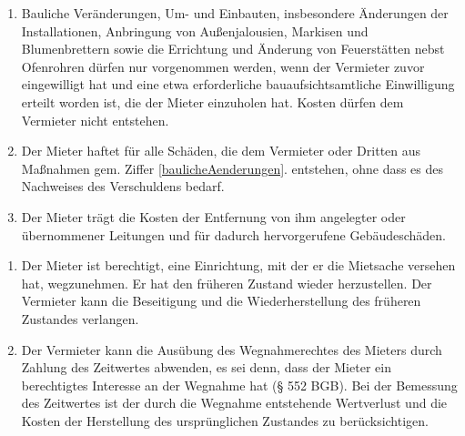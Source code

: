 \documentclass{scrreprt}[12pt,a4paper,twoside,duplex]
\begin{document}
\begin{contract}
\begin{enumerate}
  \item\label{baulicheAenderungen} Bauliche Veränderungen, Um- und Einbauten, insbesondere Änderungen der
  Installationen, Anbringung von Außenjalousien, Markisen und Blumenbrettern
  sowie die Errichtung und Änderung von Feuerstätten nebst Ofenrohren dürfen nur
  vorgenommen werden, wenn der Vermieter zuvor eingewilligt hat und eine etwa
  erforderliche bauaufsichtsamtliche Einwilligung erteilt worden ist, die der
  Mieter einzuholen hat. Kosten dürfen dem Vermieter nicht entstehen.
  \item Der Mieter haftet für alle Schäden, die dem Vermieter oder Dritten aus
  Maßnahmen gem. Ziffer \ref{baulicheAenderungen}. entstehen, ohne dass es des
  Nachweises des Verschuldens bedarf.
  \item Der Mieter trägt die Kosten der Entfernung von ihm angelegter oder
  übernommener Leitungen und für dadurch hervorgerufene Gebäudeschäden.
\end{enumerate}
\end{contract}

\begin{contract}
\begin{enumerate}
  \item Der Mieter ist berechtigt, eine Einrichtung, mit der er die Mietsache
  versehen hat, wegzunehmen. Er hat den früheren Zustand wieder herzustellen.
  Der Vermieter kann die Beseitigung und die Wiederherstellung des früheren
  Zustandes verlangen.
  \item Der Vermieter kann die Ausübung des Wegnahmerechtes des Mieters durch
  Zahlung des Zeitwertes abwenden, es sei denn, dass der Mieter ein berechtigtes
  Interesse an der Wegnahme hat (§ 552 BGB). Bei der Bemessung des Zeitwertes
  ist der durch die Wegnahme entstehende Wertverlust und die Kosten der
  Herstellung des ursprünglichen Zustandes zu berücksichtigen.
\end{enumerate}
\end{contract}
\end{document}

